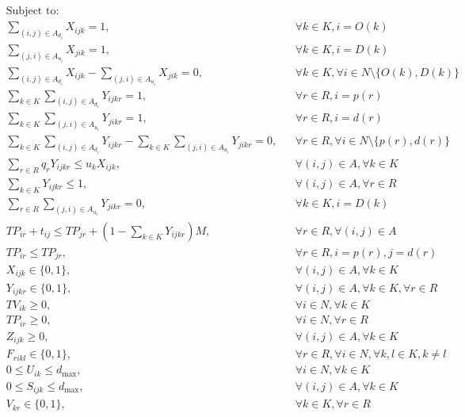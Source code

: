 \documentclass[10pt]{article}
\begin{document}
\[
\begin{aligned}
&\text{Subject to:} \\
& \sum_{(i,j) \in A_{d_i}} X_{ijk} = 1, && \forall k \in K, i = O(k) \\
& \sum_{(j,i) \in A_{u_i}} X_{jik} = 1, && \forall k \in K, i = D(k) \\
& \sum_{(i,j) \in A_{d_i}} X_{ijk} - \sum_{(j,i) \in A_{u_i}} X_{jik} = 0, && \forall k \in K, \forall i \in N \setminus \{O(k), D(k)\} \\
& \sum_{k \in K} \sum_{(i,j) \in A_{d_i}} Y_{ijkr} = 1, && \forall r \in R, i = p(r) \\
& \sum_{k \in K} \sum_{(j,i) \in A_{u_i}} Y_{jikr} = 1, && \forall r \in R, i = d(r) \\
& \sum_{k \in K} \sum_{(i,j) \in A_{d_i}} Y_{ijkr} - \sum_{k \in K} \sum_{(j,i) \in A_{u_i}} Y_{jikr} = 0, && \forall r \in R, \forall i \in N \setminus \{p(r), d(r)\} \\
& \sum_{r \in R} q_r Y_{ijkr} \leq u_k X_{ijk}, && \forall (i, j) \in A, \forall k \in K \\
& \sum_{k \in K} Y_{ijkr} \leq 1, && \forall (i, j) \in A, \forall r \in R \\
& \sum_{r \in R} \sum_{(j,i) \in A_{u_i}} Y_{jikr} = 0, && \forall k \in K, i = D(k) \\
& TP_{ir} + t_{ij} \leq TP_{jr} + \left( 1 - \sum_{k \in K} Y_{ijkr} \right) M, && \forall r \in R, \forall (i, j) \in A \\
& TP_{ir} \leq TP_{jr}, && \forall r \in R, i = p(r), j = d(r) \\
& X_{ijk} \in \{0, 1\}, && \forall (i, j) \in A, \forall k \in K \\
& Y_{ijkr} \in \{0, 1\}, && \forall (i, j) \in A, \forall k \in K, \forall r \in R \\
& TV_{ik} \geq 0, && \forall i \in N, \forall k \in K \\
& TP_{ir} \geq 0, && \forall i \in N, \forall r \in R \\
& Z_{ijk} \geq 0, && \forall (i, j) \in A, \forall k \in K \\
& F_{rikl} \in \{0, 1\}, && \forall r \in R, \forall i \in N, \forall k, l \in K, k \neq l \\
& 0 \leq U_{ik} \leq d_{\max}, && \forall i \in N, \forall k \in K \\
& 0 \leq S_{ijk} \leq d_{\max}, && \forall (i, j) \in A, \forall k \in K \\
& V_{kr} \in \{0, 1\}, && \forall k \in K, \forall r \in R \\

\end{aligned}\]
\end{document}
